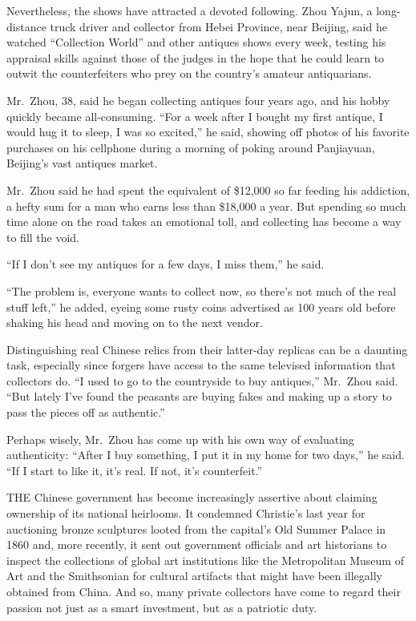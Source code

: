 ﻿\documentclass[12pt]{article}
\begin{document}
Nevertheless, the shows have attracted a devoted following. Zhou Yajun, a long-distance truck driver
and collector from Hebei Province, near Beijing, said he watched ``Collection World'' and other
antiques shows every week, testing his appraisal skills against those of the judges in the hope that
he could learn to outwit the counterfeiters who prey on the country's amateur antiquarians.

Mr.~Zhou, 38, said he began collecting antiques four years ago, and his hobby quickly became
all-consuming. ``For a week after I bought my first antique, I would hug it to sleep, I was so
excited,'' he said, showing off photos of his favorite purchases on his cellphone during a morning
of poking around Panjiayuan, Beijing's vast antiques market.

Mr.~Zhou said he had spent the equivalent of \$12,000 so far feeding his addiction, a hefty sum for
a man who earns less than \$18,000 a year. But spending so much time alone on the road takes an
emotional toll, and collecting has become a way to fill the void.

``If I don't see my antiques for a few days, I miss them,'' he said.

``The problem is, everyone wants to collect now, so there's not much of the real stuff left,'' he
added, eyeing some rusty coins advertised as 100 years old before shaking his head and moving on to
the next vendor.

Distinguishing real Chinese relics from their latter-day replicas can be a daunting task, especially
since forgers have access to the same televised information that collectors do. ``I used to go to
the countryside to buy antiques,'' Mr.~Zhou said. ``But lately I've found the peasants are buying
fakes and making up a story to pass the pieces off as authentic.''

Perhaps wisely, Mr.~Zhou has come up with his own way of evaluating authenticity: ``After I buy
something, I put it in my home for two days,'' he said. ``If I start to like it, it's real. If not,
it's counterfeit.''

THE Chinese government has become increasingly assertive about claiming ownership of its national
heirlooms. It condemned Christie's last year for auctioning bronze sculptures looted from the
capital's Old Summer Palace in 1860 and, more recently, it sent out government officials and art
historians to inspect the collections of global art institutions like the Metropolitan Museum of Art
and the Smithsonian for cultural artifacts that might have been illegally obtained from China. And
so, many private collectors have come to regard their passion not just as a smart investment, but as
a patriotic duty.
\end{document}

